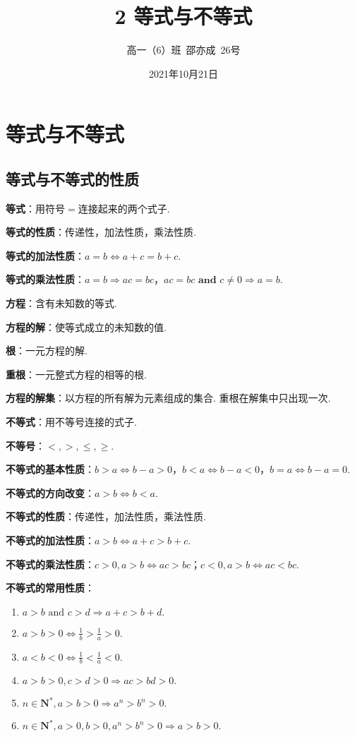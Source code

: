 \documentclass[8pt]{article}
\title{2 等式与不等式}
\author{高一（6）班\ 邵亦成\ 26号}
\date{2021年10月21日}
\begin{document}
	\maketitle

	\section{等式与不等式}
		\subsection{等式与不等式的性质}
			\textbf{等式}：用符号$=$连接起来的两个式子.

			\textbf{等式的性质}：传递性，加法性质，乘法性质.

			\textbf{等式的加法性质}：$a=b\Leftrightarrow a+c=b+c$.

			\textbf{等式的乘法性质}：$a=b\Rightarrow ac=bc$，$ac=bc \textbf{ and } c\neq 0 \Rightarrow a=b$.

			\textbf{方程}：含有未知数的等式.

			\textbf{方程的解}：使等式成立的未知数的值.

			\textbf{根}：一元方程的解.

			\textbf{重根}：一元整式方程的相等的根.

			\textbf{方程的解集}：以方程的所有解为元素组成的集合. 重根在解集中只出现一次.

			\textbf{不等式}：用不等号连接的式子.

			\textbf{不等号}：$<, >, \leq, \geq$.

			\textbf{不等式的基本性质}：$b>a \Leftrightarrow b-a>0$，$b<a \Leftrightarrow b-a<0$，$b=a \Leftrightarrow b-a=0$.

			\textbf{不等式的方向改变}：$a>b \Leftrightarrow b<a$.

			\textbf{不等式的性质}：传递性，加法性质，乘法性质.

			\textbf{不等式的加法性质}：$a>b \Leftrightarrow a+c>b+c.$

			\textbf{不等式的乘法性质}：$c>0, a>b\Leftrightarrow ac>bc$；$c<0, a>b\Leftrightarrow ac<bc$.

			\textbf{不等式的常用性质}：

			\begin{enumerate}[label=(\arabic*)]
				\item $a>b \text{ and } c>d \Rightarrow a+c>b+d.$
				\item $a>b>0 \Leftrightarrow \frac{1}{b}>\frac{1}{a}>0.$
				\item $a<b<0 \Leftrightarrow \frac{1}{b}<\frac{1}{a}<0.$
				\item $a>b>0, c>d>0 \Rightarrow ac>bd>0.$
				\item $n\in\mathbf{N}^{*}, a>b>0 \Rightarrow a^n>b^n>0.$
				\item $n\in\mathbf{N}^{*}, a>0, b>0, a^n>b^n>0 \Rightarrow a>b>0.$
			\end{enumerate}
\end{document}
